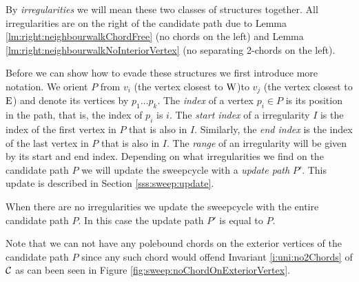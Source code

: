     By \emph{irregularities} we will mean these two classes of structures together.
    All irregularities are on the right of the candidate path due to Lemma \ref{lm:right:neighbourwalkChordFree} (no chords on the left) and Lemma \ref{lm:right:neighbourwalkNoInteriorVertex} (no separating 2-chords on the left).

    Before we can show how to evade these structures we first introduce more notation. We orient $P$ from $v_i$ (the vertex closest to $\mathrm{W}$)to $v_j$ (the vertex closest to $\mathrm{E}$) and denote its vertices by $p_1 \ldots p_k$.
    The \emph{index} of a vertex $p_i \in P$ is its position in the path, that is, the index of $p_i$ is $i$.
    The \emph{start index} of a irregularity $I$ is the index of the first vertex in $P$ that is also in $I$. Similarly, the \emph{end index} is the index of the last vertex in $P$ that is also in $I$.
    The \emph{range} of an irregularity will be given by its start and end index. Depending on what irregularities we find on the candidate path $P$ we will update the sweepcycle with a \emph{update path} $P'$. This update is described in Section \ref{sss:sweep:update}.

      When there are no irregularities we update the sweepcycle with the entire candidate path $P$.
      In this case the update path $P'$ is equal to $P$.

      Note that we can not have any polebound chords on the exterior vertices of the candidate path $P$ since any such chord would offend Invariant \ref{i:uni:no2Chords} of $\mathcal{C}$ as can been seen in Figure \ref{fig:sweep:noChordOnExteriorVertex}.

